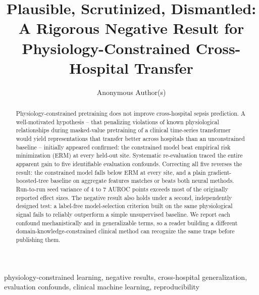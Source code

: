 \documentclass[pmlr,twocolumn,10pt]{jmlr} %
\title[Why a Principled Physiology Constraint Failed]{Plausible, Scrutinized, Dismantled: A Rigorous Negative Result for Physiology-Constrained Cross-Hospital Transfer}
\author{Anonymous Author(s)}
\begin{document}
\maketitle


\ifmlhdemo\else
\begin{abstract}
Physiology-constrained pretraining does not improve cross-hospital sepsis
prediction. A well-motivated hypothesis -- that penalizing violations of
known physiological relationships during masked-value pretraining of a
clinical time-series transformer would yield representations that transfer
better across hospitals than an unconstrained baseline -- initially appeared
confirmed: the constrained model beat empirical risk minimization (ERM) at
every held-out site. Systematic re-evaluation traced the entire apparent
gain to five identifiable evaluation confounds. Correcting all five reverses
the result: the constrained model falls below ERM at every site, and a plain
gradient-boosted-tree baseline on aggregate features matches or beats both
neural methods. Run-to-run seed variance of 4 to 7 AUROC points exceeds most
of the originally reported effect sizes. The
negative result also holds under a second, independently designed test: a
label-free model-selection criterion built on the same physiological signal
fails to reliably outperform a simple unsupervised baseline. We report each
confound mechanistically and in generalizable terms, so a reader building a
different domain-knowledge-constrained clinical method can recognize the
same traps before publishing them.
\end{abstract}
\begin{keywords}
physiology-constrained learning, negative results, cross-hospital
generalization, evaluation confounds, clinical machine learning,
reproducibility
\end{keywords}
\fi

\ifmlhneedsstatements
\end{document}
